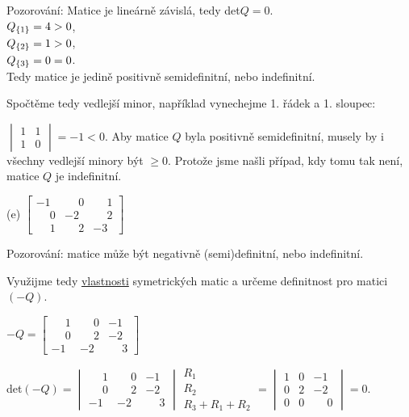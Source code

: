 Pozorování: Matice je lineárně závislá, tedy det$Q = 0$. \\
$Q_{\left\lbrace 1 \right\rbrace} = 4 > 0$,\\
$Q_{\left\lbrace 2 \right\rbrace} = 1 > 0$,\\
$Q_{\left\lbrace 3 \right\rbrace} = 0 = 0$.\\
Tedy matice je jedině positivně semidefinitní, nebo indefinitní.

Spočtěme tedy vedlejší minor, například vynechejme 1. řádek a 1. sloupec: 

$\begin{vmatrix}
    1 & 1 \\
    1 & 0
\end{vmatrix} = -1 < 0$. Aby matice $Q$ byla positivně semidefinitní, musely by i všechny vedlejší minory být $\geq 0$. 
Protože jsme našli případ, kdy tomu tak není, matice $Q$ je indefinitní.


(e)
$\begin{bmatrix}
    -1 & \phantom{-}0 & \phantom{-}1 \\
    \phantom{-}0 & -2 & \phantom{-}2 \\
    \phantom{-}1 & \phantom{-}2 & -3
\end{bmatrix}$

Pozorování: matice může být negativně (semi)definitní, nebo indefinitní.

Využijme tedy \hyperref[matiVlastnost]{vlastnosti} symetrických matic a určeme definitnost pro matici $(-Q)$.

$-Q = \begin{bmatrix}
    \phantom{-}1 & \phantom{-}0 & -1 \\
    \phantom{-}0 & \phantom{-}2 & -2 \\
    -1 & -2 & \phantom{-}3
\end{bmatrix}$

det$(-Q) = \begin{vmatrix}
    \phantom{-}1 & \phantom{-}0 & -1 \\
    \phantom{-}0 & \phantom{-}2 & -2 \\
    -1 & -2 & \phantom{-}3
\end{vmatrix}
\begin{array}{l}
    R_1 \\
    R_2 \\
    R_3 + R_1 + R_2
\end{array} = 
\begin{vmatrix}
    1 & 0 & -1 \\
    0 & 2 & -2 \\
    0 & 0 & \phantom{-}0
\end{vmatrix} = 0.$

